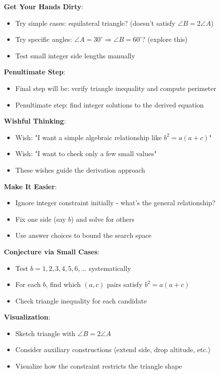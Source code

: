 \documentclass[12pt]{article}
\begin{document}
\begin{strategicbox}
\textbf{Get Your Hands Dirty}:
\begin{itemize}
    \item Try simple cases: equilateral triangle? (doesn't satisfy $\angle B = 2\angle A$)
    \item Try specific angles: $\angle A = 30^\circ \Rightarrow \angle B = 60^\circ$? (explore this)
    \item Test small integer side lengths manually
\end{itemize}

\textbf{Penultimate Step}:
\begin{itemize}
    \item Final step will be: verify triangle inequality and compute perimeter
    \item Penultimate step: find integer solutions to the derived equation
\end{itemize}

\textbf{Wishful Thinking}:
\begin{itemize}
    \item Wish: "I want a simple algebraic relationship like $b^2 = a(a+c)$"
    \item Wish: "I want to check only a few small values"
    \item These wishes guide the derivation approach
\end{itemize}

\textbf{Make It Easier}:
\begin{itemize}
    \item Ignore integer constraint initially - what's the general relationship?
    \item Fix one side (say $b$) and solve for others
    \item Use answer choices to bound the search space
\end{itemize}

\textbf{Conjecture via Small Cases}:
\begin{itemize}
    \item Test $b = 1, 2, 3, 4, 5, 6, \ldots$ systematically
    \item For each $b$, find which $(a,c)$ pairs satisfy $b^2 = a(a+c)$
    \item Check triangle inequality for each candidate
\end{itemize}

\textbf{Visualization}:
\begin{itemize}
    \item Sketch triangle with $\angle B = 2\angle A$
    \item Consider auxiliary constructions (extend side, drop altitude, etc.)
    \item Visualize how the constraint restricts the triangle shape
\end{itemize}


\end{strategicbox}
\end{document}
